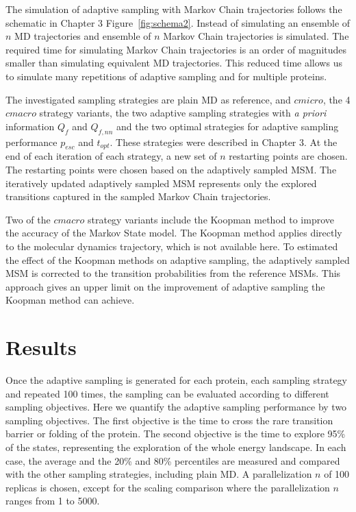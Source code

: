 The simulation of adaptive sampling with Markov Chain trajectories follows the schematic in Chapter 3 Figure~\ref{fig:schema2}. 
Instead of simulating an ensemble of $n$ MD trajectories and ensemble of $n$ Markov Chain trajectories is simulated. The required time for simulating Markov Chain trajectories is an order of magnitudes smaller than simulating equivalent MD trajectories. This reduced time allows us to simulate many repetitions of adaptive sampling and for multiple proteins.

The investigated sampling strategies are plain MD as reference, and $cmicro$, the 4 $cmacro$ strategy variants, the two adaptive sampling strategies with \emph{a priori} information $Q_{f}$ and $Q_{f,nn}$ and the two optimal strategies for adaptive sampling performance $p_{esc}$ and $t_{opt}$.  These strategies were described in Chapter 3.
At the end of each iteration of each strategy, a new set of $n$ restarting points are chosen. The restarting points were chosen based on the adaptively sampled MSM. The iteratively updated adaptively sampled MSM represents only the explored transitions captured in the sampled Markov Chain trajectories. 

Two of the $cmacro$ strategy variants include the Koopman method to improve the accuracy of the Markov State model. The Koopman method applies directly to the molecular dynamics trajectory, which is not available here. To estimated the effect of the Koopman methods on adaptive sampling, the adaptively sampled MSM is corrected to the transition probabilities from the reference MSMs. This approach gives an upper limit on the improvement of adaptive sampling the Koopman method can achieve. 


\section{\label{sec:results}Results}

Once the adaptive sampling is generated for each protein, each sampling strategy and repeated 100 times, the sampling can be evaluated according to different sampling objectives.
Here we quantify the adaptive sampling performance by two sampling objectives. The first objective is the time to cross the rare transition barrier or folding of the protein. The second objective is the time to explore 95\% of the states, representing the exploration of the whole energy landscape.
In each case, the average and the 20\% and 80\% percentiles are measured and compared with the other sampling strategies, including plain MD. A parallelization $n$ of 100 replicas is chosen, except for the scaling comparison where the parallelization $n$ ranges from 1 to 5000. 

